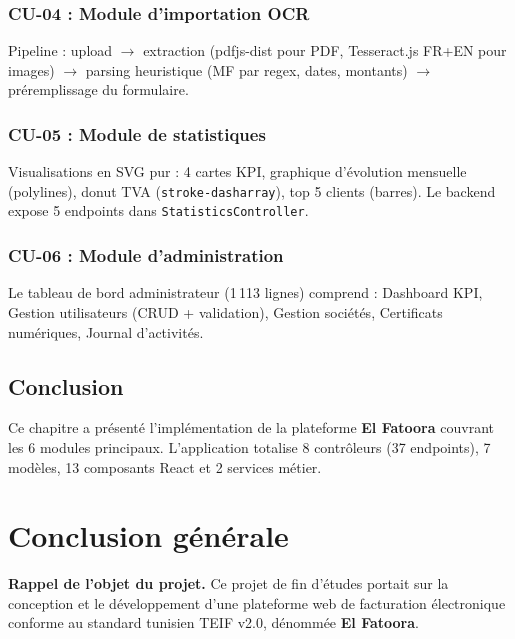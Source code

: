 \documentclass[a4paper,12pt]{report}
\newcommand{\elfattoora}{\textbf{El Fatoora}}
\begin{document}
\subsection{CU-04 : Module d'importation OCR}

Pipeline : upload $\rightarrow$ extraction (pdfjs-dist pour PDF, Tesseract.js FR+EN pour images) $\rightarrow$ parsing heuristique (MF par regex, dates, montants) $\rightarrow$ préremplissage du formulaire.

\subsection{CU-05 : Module de statistiques}

Visualisations en SVG pur : 4 cartes KPI, graphique d'évolution mensuelle (polylines), donut TVA (\texttt{stroke-dasharray}), top 5 clients (barres). Le backend expose 5 endpoints dans \texttt{StatisticsController}.

\subsection{CU-06 : Module d'administration}

Le tableau de bord administrateur (1\,113 lignes) comprend : Dashboard KPI, Gestion utilisateurs (CRUD + validation), Gestion sociétés, Certificats numériques, Journal d'activités.

\section{Conclusion}

Ce chapitre a présenté l'implémentation de la plateforme \elfattoora{} couvrant les 6 modules principaux. L'application totalise 8 contrôleurs (37 endpoints), 7 modèles, 13 composants React et 2 services métier.


\chapter*{Conclusion générale}

\textbf{Rappel de l'objet du projet.} Ce projet de fin d'études portait sur la conception et le développement d'une plateforme web de facturation électronique conforme au standard tunisien TEIF v2.0, dénommée \elfattoora{}.
\end{document}
